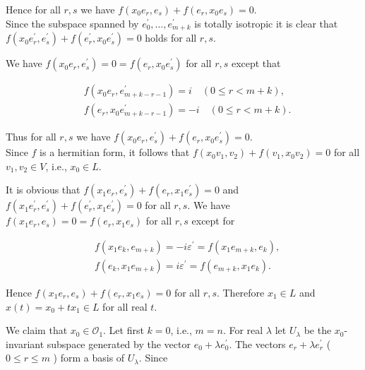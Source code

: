 \documentclass[10pt]{article}
\begin{document}
Hence for all $r, s$ we have $f\left(x_{0} e_{r}, e_{s}\right)+f\left(e_{r}, x_{0} e_{s}\right)=0$.\\
Since the subspace spanned by $e_{0}^{\prime}, \ldots, e_{m+k}^{\prime}$ is totally isotropic it is clear that $f\left(x_{0} e_{r}^{\prime}, e_{s}^{\prime}\right)+f\left(e_{r}^{\prime}, x_{0} e_{s}^{\prime}\right)=0$ holds for all $r, s$.

We have $f\left(x_{0} e_{r}, e_{s}^{\prime}\right)=0=f\left(e_{r}, x_{0} e_{s}^{\prime}\right)$ for all $r, s$ except that

$$
\begin{aligned}
& f\left(x_{0} e_{r}, e_{m+k-r-1}^{\prime}\right)=i \quad(0 \leqslant r<m+k), \\
& f\left(e_{r}, x_{0} e_{m+k-r-1}^{\prime}\right)=-i \quad(0 \leqslant r<m+k) .
\end{aligned}
$$

Thus for all $r, s$ we have $f\left(x_{0} e_{r}, e_{s}^{\prime}\right)+f\left(e_{r}, x_{0} e_{s}^{\prime}\right)=0$.\\
Since $f$ is a hermitian form, it follows that $f\left(x_{0} v_{1}, v_{2}\right)+f\left(v_{1}, x_{0} v_{2}\right)=0$ for all $v_{1}, v_{2} \in V$, i.e., $x_{0} \in L$.

It is obvious that $f\left(x_{1} e_{r}, e_{s}^{\prime}\right)+f\left(e_{r}, x_{1} e_{s}^{\prime}\right)=0$ and $f\left(x_{1} e_{r}^{\prime}, e_{s}^{\prime}\right)+f\left(e_{r}^{\prime}, x_{1} e_{s}^{\prime}\right)=0$ for all $r, s$. We have $f\left(x_{1} e_{r}, e_{s}\right)=0=f\left(e_{r}, x_{1} e_{s}\right)$ for all $r, s$ except for

$$
\begin{aligned}
& f\left(x_{1} e_{k}, e_{m+k}\right)=-i \varepsilon^{\prime}=f\left(x_{1} e_{m+k}, e_{k}\right), \\
& f\left(e_{k}, x_{1} e_{m+k}\right)=i \varepsilon^{\prime}=f\left(e_{m+k}, x_{1} e_{k}\right) .
\end{aligned}
$$

Hence $f\left(x_{1} e_{r}, e_{s}\right)+f\left(e_{r}, x_{1} e_{s}\right)=0$ for all $r, s$. Therefore $x_{1} \in L$ and $x(t)=x_{0}+t x_{1} \in L$ for all real $t$.

We claim that $x_{0} \in \mathcal{O}_{1}$. Let first $k=0$, i.e., $m=n$. For real $\lambda$ let $U_{\lambda}$ be the $x_{0}$-invariant subspace generated by the vector $e_{0}+\lambda e_{0}^{\prime}$. The vectors $e_{r}+\lambda e_{r}^{\prime}$ ( $0 \leqslant r \leqslant m$ ) form a basis of $U_{\lambda}$. Since
\end{document}
